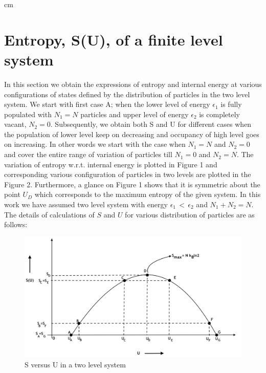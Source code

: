 \documentclass{article}
\begin{document}
 cm
\section{ Entropy, S(U),  of a finite level system}

In this section we obtain the expressions of entropy and internal energy at various configurations of  states defined by the distribution of particles in the two level system. We start with first case A; when the lower level of energy $\epsilon_1$ is fully populated with $ N_1 = N$ particles and upper level of  energy $\epsilon_2$ is completely vacant, $N_2 = 0$. Subsequently, we obtain both S and U for different cases when the population of lower level keep on decreasing and occupancy of high level goes on increasing. In other words we start with the case when $ N_1 = N$ and $ N_2 = 0$ and cover the  entire range of variation of particles till $ N_1 = 0$ and $ N_2 = N$. The variation of entropy w.r.t. internal energy is plotted in Figure 1 and corresponding various configuration of particles in  two levels are plotted in the Figure 2. Furthermore, a glance on Figure 1 shows that it is symmetric about the point $U_D$ which corresponds to the maximum entropy of the given system. In this work we have assumed two level system with energy  $ \epsilon_1 \, < \, \epsilon_2$ and $ N_1 + N_2 = N$. 
The details of calculations of $S$ and $U$ for various distribution of particles are as follows:
\begin{figure}[ht!]
\centering
\includegraphics[scale=0.4]{1A.png}
\caption{ S versus U in a two level system}
\label{6}
\end{figure}
\end{document}
